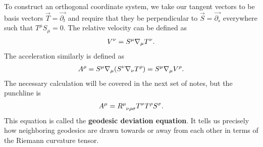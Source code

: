 \documentclass[10pt]{article}
\begin{document}
	\par To construct an orthogonal coordinate system, we take our tangent vectors to be basis vectors $\vec{T}=\vec{\partial_t}$ and require that they be perpendicular to $\vec{S}=\vec{\partial_s}$ everywhere such that $T^{\mu}S_{\mu}=0$. The relative velocity can be defined as 
	\begin{align}
		V^{\nu}=S^{\mu}\nabla_{\mu}T^{\nu}. \notag
	\end{align}
	The acceleration similarly is defined as
	\begin{align}
		A^{\rho}=S^{\mu}\nabla_{\mu}(S^{\nu}\nabla_{\nu}T^{\rho})=S^{\mu}\nabla_{\mu}V^{\rho}. \notag
	\end{align}
	The necessary calculation will be covered in the next set of notes, but the punchline is 
	\begin{align}
		A^{\mu}=\tensor{R}{^\mu_\nu_\rho_\sigma}T^{\nu}T^{\rho}S^{\sigma}.
	\end{align}
	This equation is called the \textbf{geodesic deviation equation}. It tells us precisely how neighboring geodesics are drawn towards or away from each other in terms of the Riemann curvature tensor. 

\end{document}
